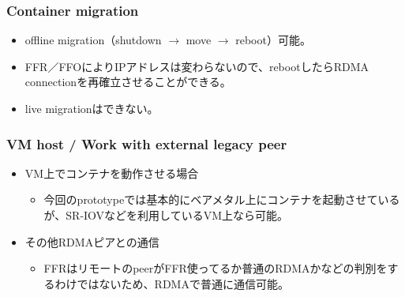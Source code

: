 \documentclass[dvipdfmx,9pt,notheorems]{beamer}
\theoremstyle{definition}
\begin{document}
\begin{frame}\frametitle{Container migration}
	\begin{itemize}
		\item offline migration（shutdown $\rightarrow$ move $\rightarrow$ reboot）可能。
		\item FFR／FFOによりIPアドレスは変わらないので、rebootしたらRDMA connectionを再確立させることができる。
		\item live migrationはできない。
	\end{itemize}
\end{frame}

\begin{frame}\frametitle{VM host / Work with external legacy peer}
	\begin{itemize}
		\item VM上でコンテナを動作させる場合
		\begin{itemize}
			\item 今回のprototypeでは基本的にベアメタル上にコンテナを起動させているが、SR-IOVなどを利用しているVM上なら可能。
		\end{itemize}
		\item その他RDMAピアとの通信
		\begin{itemize}
			\item FFRはリモートのpeerがFFR使ってるか普通のRDMAかなどの判別をするわけではないため、RDMAで普通に通信可能。
		\end{itemize}
	\end{itemize}
\end{frame}
\end{document}

